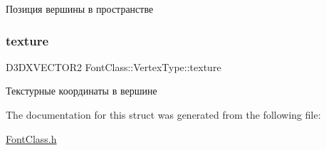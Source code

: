 Позиция вершины в пространстве 

\mbox{\label{struct_font_class_1_1_vertex_type_afe93fdaa5fbe52e3b317f0e726a5155b}} 
\subsubsection{\texorpdfstring{texture}{texture}}
{\footnotesize\ttfamily D3\+D\+X\+V\+E\+C\+T\+O\+R2 Font\+Class\+::\+Vertex\+Type\+::texture}



Текстурные координаты в вершине 



The documentation for this struct was generated from the following file\+:\begin{DoxyCompactItemize}
\item 
\hyperlink{_font_class_8h}{Font\+Class.\+h}\end{DoxyCompactItemize}
